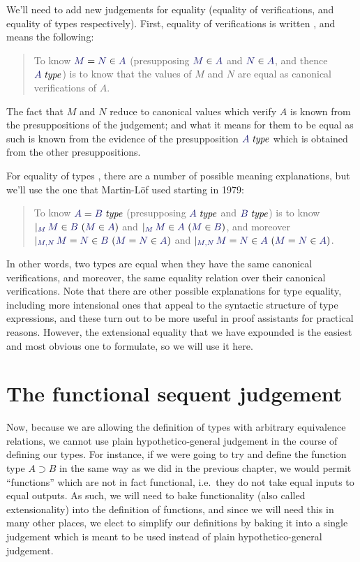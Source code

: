 \documentclass[main.tex]{subfiles}
\begin{document}
We'll need to add new judgements for equality (equality of
verifications, and equality of types respectively). First, equality of
verifications is written , and means the
following:

\begin{quote}
  To know $\ever{M}{N}{A}$ (presupposing $\ver{M}{A}$ and $\ver{N}{A}$,
  and thence $\isset{A}$) is to know that the values of $M$ and $N$ are
  equal as canonical verifications of $A$.
\end{quote}

The fact that $M$ and $N$ reduce to canonical values which verify $A$
is known from the presuppositions of the judgement; and what it means
for them to be equal as such is known from the evidence of the
presupposition $\isset{A}$ which is obtained from the other
presuppositions.

For equality of types , there are a number of
possible meaning explanations, but we'll use the one that Martin-L\"of
used starting in 1979:

\begin{quote}
  To know $\eisset{A}{B}$ (presupposing $\isset{A}$ and $\isset{B}$) is to know
$\genj{M}{\hyp{\ver{M}{B}}{\ver{M}{A}}}$ and
$\genj{M}{\hyp{\ver{M}{A}}{\ver{M}{B}}}$, and moreover
$\genj{M,N}{\hyp{\ever{M}{N}{B}}{\ever{M}{N}{A}}}$ and
$\genj{M,N}{\hyp{\ever{M}{N}{A}}{\ever{M}{N}{A}}}$.
\end{quote}

In other words, two types are equal when they have the same canonical
verifications, and moreover, the same equality relation over their canonical
verifications. Note that there are other possible explanations for type
equality, including more intensional ones that appeal to the syntactic
structure of type expressions, and these turn out to be more useful in proof
assistants for practical reasons. However, the extensional equality that we
have expounded is the easiest and most obvious one to formulate, so we will
use it here.

\section{The functional sequent judgement}

Now, because we are allowing the definition of types with arbitrary equivalence
relations, we cannot use plain hypothetico-general judgement in the course of
defining our types. For instance, if we were going to try and define the
function type $A\supset B$ in the same way as we did in the previous chapter,
we would permit ``functions'' which are not in fact functional, i.e.\ they do
not take equal inputs to equal outputs. As such, we will need to bake
functionality (also called extensionality) into the definition of functions,
and since we will need this in many other places, we elect to simplify our
definitions by baking it into a single judgement which is meant to be used
instead of plain hypothetico-general judgement.
\end{document}
